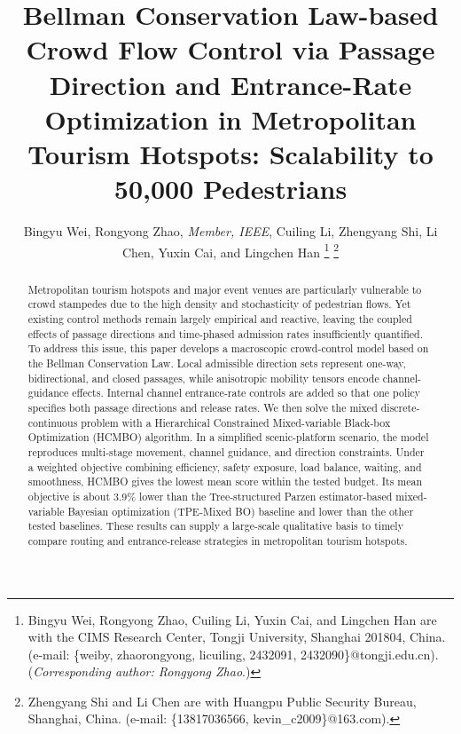 \documentclass[lettersize,journal]{IEEEtran}
\begin{document}
\title{Bellman Conservation Law-based Crowd Flow Control via Passage Direction and Entrance-Rate Optimization in Metropolitan Tourism Hotspots: Scalability to 50,000 Pedestrians}

\author{Bingyu Wei, Rongyong Zhao, \textit{Member, IEEE}, Cuiling Li, Zhengyang Shi, Li Chen, Yuxin Cai, and Lingchen Han
\thanks{Bingyu Wei, Rongyong Zhao, Cuiling Li, Yuxin Cai, and Lingchen Han are with the CIMS Research Center, Tongji University, Shanghai 201804, China. (e-mail: \{weiby, zhaorongyong, licuiling, 2432091, 2432090\}@tongji.edu.cn). (\textit{Corresponding author: Rongyong Zhao}.)}
\thanks{Zhengyang Shi and Li Chen are with Huangpu Public Security Bureau, Shanghai, China. (e-mail: \{13817036566, kevin\_c2009\}@163.com).}}


\maketitle

\begin{abstract}
Metropolitan tourism hotspots and major event venues are particularly vulnerable to crowd stampedes due to the high density and stochasticity of pedestrian flows. Yet existing control methods remain largely empirical and reactive, leaving the coupled effects of passage directions and time-phased admission rates insufficiently quantified. To address this issue, this paper develops a macroscopic crowd-control model based on the Bellman Conservation Law. Local admissible direction sets represent one-way, bidirectional, and closed passages, while anisotropic mobility tensors encode channel-guidance effects. Internal channel entrance-rate controls are added so that one policy specifies both passage directions and release rates. We then solve the mixed discrete-continuous problem with a Hierarchical Constrained Mixed-variable Black-box Optimization (HCMBO) algorithm. In a simplified scenic-platform scenario, the model reproduces multi-stage movement, channel guidance, and direction constraints. Under a weighted objective combining efficiency, safety exposure, load balance, waiting, and smoothness, HCMBO gives the lowest mean score within the tested budget. Its mean objective is about 3.9\% lower than the Tree-structured Parzen estimator-based mixed-variable Bayesian optimization (TPE-Mixed BO) baseline and lower than the other tested baselines. These results can supply a large-scale qualitative basis to timely compare routing and entrance-release strategies in metropolitan tourism hotspots.
\end{abstract}
\end{document}
